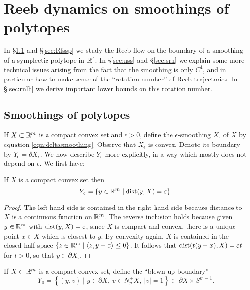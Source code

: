 
\section{Reeb dynamics on smoothings of polytopes}
\label{sec:smoothingdynamics}

In \S\ref{sec:smoothings} and \S\ref{sec:Rfssp} we study the Reeb flow on the boundary of a smoothing of a symplectic polytope in ${\mathbb R}^4$. In \S\ref{sec:nss} and \S\ref{sec:srn} we explain some more technical issues arising from the fact that the smoothing is only $C^1$, and in particular how to make sense of the ``rotation number'' of Reeb trajectories. In \S\ref{sec:rnlb} we derive important lower bounds on this rotation number. 

\subsection{Smoothings of polytopes}
\label{sec:smoothings}

If $X\subset{\mathbb R}^m$ is a compact convex set and $\epsilon>0$, define the $\epsilon$-smoothing $X_\epsilon$ of $X$ by equation \eqref{eqn:deltasmoothing}.
Observe that $X_\epsilon$ is convex. Denote its boundary by $Y_\epsilon = \partial X_\epsilon$. We now describe $Y_\epsilon$ more explicitly, in a way which mostly does not depend on $\epsilon$. We first have:

\begin{lemma}
\label{lem:Yepsilon}
If $X$ is a compact convex set then
\[
Y_\varepsilon = \{y \in {\mathbb R}^m\mid \operatorname{dist}(y,X) = \varepsilon\}.
\]
\end{lemma}

\begin{proof}
The left hand side is contained in the right hand side because distance to $X$ is a continuous function on ${\mathbb R}^m$. The reverse inclusion holds because given $y\in {\mathbb R}^m$ with $\operatorname{dist}(y,X)=\varepsilon$, since $X$ is compact and convex, there is a unique point $x\in X$ which is closest to $y$. By convexity again, $X$ is contained in the closed half-space $\{z\in {\mathbb R}^m\mid \langle z, y-x\rangle \le 0\}$. It follows that $\operatorname{dist}(t(y-x),X)=\varepsilon t$ for $t>0$, so that $y\in\partial X_\epsilon$.
\end{proof}

\begin{definition}
If $X\subset{\mathbb R}^m$ is a compact convex set, define the ``blown-up boundary''
\[
Y_0 = \left\{(y,v) \;\big|\; y\in \partial X,\; v\in N_y^+X,\; |v|=1\right\}\subset\partial X \times S^{m-1}.
\]
\end{definition}

